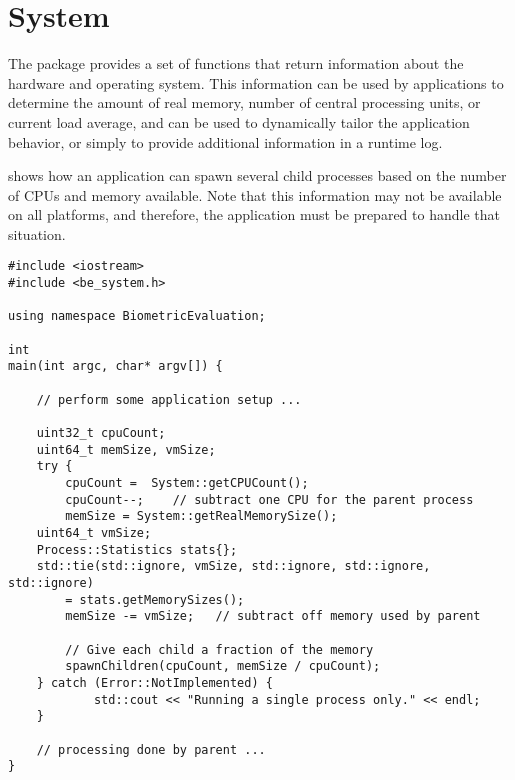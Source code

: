 %
%
\chapter{System}
\label{chp-system}
The  package provides a set of functions that
return information about the hardware and operating system. This information
can be used by applications to determine the amount of real memory, number of
central processing units, or current load average, and can be
used to dynamically tailor the application behavior, or simply to provide
additional information in a runtime log.

 shows how an application can spawn several child
processes based on the number of CPUs and memory available. Note that this
information may not be available on all platforms, and therefore, the
application must be prepared to handle that situation.

\begin{lstlisting}[caption={Using the \namespace{System} CPU Count Information}, label=lst:cpucountuse]
#include <iostream>
#include <be_system.h>

using namespace BiometricEvaluation;

int
main(int argc, char* argv[]) {

    // perform some application setup ...

    uint32_t cpuCount;
    uint64_t memSize, vmSize;
    try {
        cpuCount =  System::getCPUCount();
        cpuCount--;    // subtract one CPU for the parent process
        memSize = System::getRealMemorySize();
	uint64_t vmSize;
	Process::Statistics stats{};
	std::tie(std::ignore, vmSize, std::ignore, std::ignore, std::ignore)
	    = stats.getMemorySizes();
        memSize -= vmSize;   // subtract off memory used by parent

        // Give each child a fraction of the memory
        spawnChildren(cpuCount, memSize / cpuCount);
    } catch (Error::NotImplemented) {
            std::cout << "Running a single process only." << endl;
    }

    // processing done by parent ...
}

\end{lstlisting}
